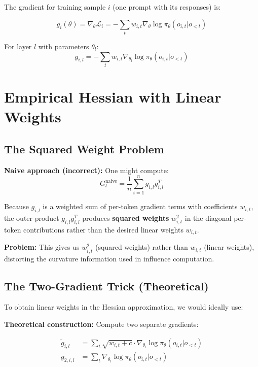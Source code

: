 \documentclass{article}
\begin{document}
The gradient for training sample $i$ (one prompt with its responses) is:

\begin{equation}
g_i(\theta) = \nabla_\theta \mathcal{L}_i = -\sum_t w_{i,t} \nabla_\theta \log\pi_\theta(o_{i,t}|o_{<t})
\end{equation}

For layer $l$ with parameters $\theta_l$:
\begin{equation}
g_{i,l} = -\sum_t w_{i,t} \nabla_{\theta_l} \log\pi_\theta(o_{i,t}|o_{<t})
\end{equation}

\section{Empirical Hessian with Linear Weights}

\subsection{The Squared Weight Problem}

\textbf{Naive approach (incorrect):} One might compute:
\begin{equation}
G_l^{\text{naive}} = \frac{1}{n}\sum_{i=1}^n g_{i,l}g_{i,l}^T
\end{equation}

Because $g_{i,l}$ is a weighted sum of per-token gradient terms with coefficients $w_{i,t}$, the outer product $g_{i,l}g_{i,l}^T$ produces \textbf{squared weights} $w_{i,t}^2$ in the diagonal per-token contributions rather than the desired linear weights $w_{i,t}$.

\textbf{Problem:} This gives us $w_{i,t}^2$ (squared weights) rather than $w_{i,t}$ (linear weights), distorting the curvature information used in influence computation.

\subsection{The Two-Gradient Trick (Theoretical)}

To obtain linear weights in the Hessian approximation, we would ideally use:

\textbf{Theoretical construction:} Compute two separate gradients:

\begin{align}
\tilde{g}_{i,l} &= \sum_t \sqrt{w_{i,t} + c} \cdot \nabla_{\theta_l}\log\pi_\theta(o_{i,t}|o_{<t}) \\
g_{2,i,l} &= \sum_t \nabla_{\theta_l}\log\pi_\theta(o_{i,t}|o_{<t})
\end{align}
\end{document}
